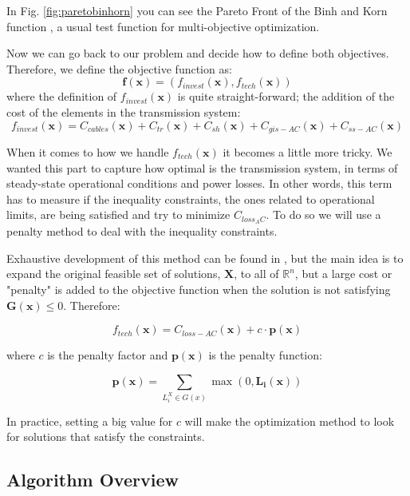 \documentclass[a4paper,11pt, titlepage, twoside]{article}
\begin{document}
In Fig. \ref{fig:paretobinhorn} you can see the Pareto Front of the Binh and Korn function \cite{binhorn}, a usual test function for multi-objective optimization.

Now we can go back to our problem and decide how to define both objectives. Therefore, we define the objective function as:
\begin{equation}
    \mathbf{f}(\mathbf{x}) =(f_{invest}(\mathbf{x}),f_{tech}(\mathbf{x}))
\end{equation}
where the definition of $f_{invest}(\mathbf{x})$ is quite straight-forward; the addition of the cost of the elements in the transmission system:
\begin{equation}
    f_{invest}(\mathbf{x}) = C_{cables}(\mathbf{x}) + C_{tr}(\mathbf{x}) + C_{sh}(\mathbf{x}) + C_{gis-AC}(\mathbf{x}) + C_{ss-AC}(\mathbf{x})
\end{equation}

When it comes to how we handle  $f_{tech}(\mathbf{x})$ it becomes a little more tricky. We wanted this part to capture how optimal is the transmission system, in terms of steady-state operational conditions and power losses. In other words, this term has to measure if the inequality constraints, the ones related to operational
limits, are being satisfied and try to minimize $C_{loss_AC}$. To do so we will use a penalty method to deal with the inequality constraints.\par

Exhaustive development of this method can be found in \cite{penalty}, but the main idea is to expand the original feasible set of solutions, $ \mathbf{X}$, to all of $\mathbb{R}^n$, but a large cost or "penalty" is added to the objective function when the solution is not satisfying
 $\mathbf{G(x)} \leq 0 $. Therefore:

\begin{equation}
    f_{tech}(\mathbf{x}) = C_{loss-AC}(\mathbf{x}) + c \cdot \mathbf{p(x)}
\end{equation}

where $c$ is the penalty factor and $\mathbf{p(x)}$ is the penalty function:

\begin{equation}
    \mathbf{p(x)} = \sum_{L_i^X \in G(x)} \max(0, \mathbf{L_i(x)})
\end{equation}

In practice, setting a big value for $c$ will make the optimization method to look for solutions that satisfy the constraints.
\subsection{Algorithm Overview}
\end{document}
